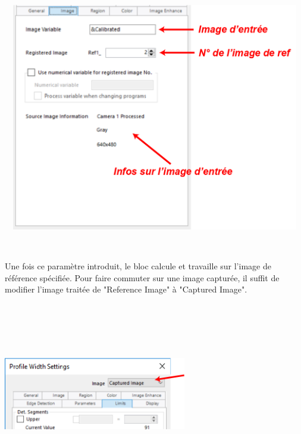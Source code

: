 \noindent
\begin{minipage}[c]{\textwidth}
  \centering
  \includegraphics[width=16cm, height=10cm, keepaspectratio]{addOns/LaboCalib_RefImageUnitParameters.png}
  \label{fig.Image_RefImages}
\end{minipage}\\
\vspace{0.3cm}

Une fois ce paramètre introduit, le bloc calcule et travaille sur l'image de référence spécifiée. Pour faire commuter sur une image capturée, il suffit de modifier l'image traitée de "Reference Image" à "Captured Image".\\

\noindent
\begin{minipage}[c]{\textwidth}
  \centering
  \includegraphics[width=8cm, height=8cm, keepaspectratio]{addOns/LaboCalib_RefImageSwitch.png}
  \label{fig.Image_RefImagesSwitch}
\end{minipage}\\
\vspace{0.3cm}

